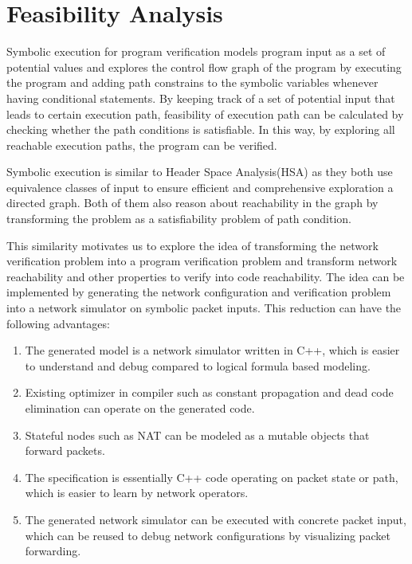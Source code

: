 \documentclass[letterpaper, 10 pt, conference]{ieeeconf}  %
\begin{document}
\section{Feasibility Analysis}\label{sec:feasibility}

Symbolic execution for program verification models program input as a set of potential values and explores the control flow graph of the program by executing the program and adding path constrains to the symbolic variables whenever having conditional statements. By keeping track of a set of potential input that leads to certain execution path, feasibility of  execution path can be calculated by checking whether the path conditions is satisfiable. In this way, by exploring all reachable execution paths, the program can be verified.

Symbolic execution is similar to Header Space Analysis(HSA) as they both use equivalence classes of input to ensure efficient and comprehensive exploration a directed graph. Both of them also reason about reachability in the graph by transforming the problem as a satisfiability problem of path condition.

This similarity motivates us to explore the idea of transforming the network verification problem into a program verification problem and transform network reachability and other properties to verify into code reachability. The idea can be implemented by generating the network configuration and verification problem into a network simulator on symbolic packet inputs. This reduction can have the following advantages:

\begin{enumerate}
  \item The generated model is a network simulator written in C++, which is easier to understand and debug compared to logical formula based modeling.
  \item Existing optimizer in compiler such as constant propagation and dead code elimination can operate on the generated code.
  \item Stateful nodes such as NAT can be modeled as a mutable objects that forward packets.
  \item The specification is essentially C++ code operating on packet state or path, which is easier to learn by network operators.
  \item The generated network simulator can be executed with concrete packet input, which can be reused to debug network configurations by visualizing packet forwarding.
\end{enumerate}
\end{document}
